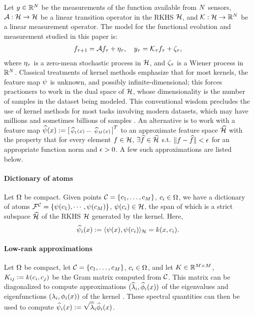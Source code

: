 Let $y\in\mathbb{R}^{N}$ be the measurements of the function available from $N$ sensors, $\mathcal{A}:\mathcal{H}\to\mathcal{H}$ be a linear transition operator in the RKHS $\mathcal{H}$, and $\mathcal{K}:\mathcal{H}\to\mathbb{R}^{N}$ be a linear measurement operator. The model for the functional evolution and measurement studied in this paper is:
\begin{align}\eqlabel{ideal_lin_evol}
 f_{\tindex+1} = \sysop f_{\tindex} + \eta_{\tindex}, \quad
 y_{\tindex} = \measop_{\tindex} f_{\tindex} + \zeta_{\tindex},
\end{align}
where $\eta_{\tau}$ is a zero-mean stochastic process in $\mathcal{H}$, and $\zeta_{\tau}$ is a Wiener process in $\mathbb{R}^{N}$. 
Classical treatments of kernel methods emphasize that for most kernels, the feature map $\psi$ is unknown, and possibly infinite-dimensional; this forces practioners to work in the dual space of $\mathcal{H}$, whose dimensionality is the number of samples in the dataset being modeled. This conventional wisdom precludes the use of kernel methods for most tasks involving modern datasets, which may have millions and sometimes billions of samples \cite{rahimi2007random}. An alternative is to work with a feature map 
$\widehat{\psi}(x) := \left[\begin{smallmatrix}
  \widehat{\psi}_1(x) & \cdots & \widehat{\psi}_{M}(x)
 \end{smallmatrix}\right]^T$ to an approximate feature space
 $\widehat{\mathcal{H}}$ with the property that for every element $f\in\mathcal{H}$, $\exists\widehat{f}\in\widehat{\mathcal{H}}$ s.t. $\|f-\widehat{f}\| < \epsilon$ for an appropriate function norm and $\epsilon>0$. A few such approximations are listed below.
 
\paragraph{Dictionary of atoms} Let $\Omega$ be compact. Given points $\mathcal{C} = \{c_1,\dots,c_{M}\}$, $c_i\in\Omega$, we have a dictionary of atoms $\mathcal{F}^{\mathcal{C}} = \{\psi(c_1), \cdots , \psi(c_{M})\}$, $\psi(c_i)\in\mathcal{H}$, the span of which is a strict subspace $\widehat{\mathcal{H}}$ of the RKHS $\mathcal{H}$ generated by the kernel. Here, 
 \begin{equation}\eqlabel{fmap_dict}
 \fmapApprox_i(x) := \l\fmap(x), \fmap(c_i)\r_{\fspace} = \kernel(x, c_i).
 \end{equation}
\paragraph{Low-rank approximations} Let $\Omega$ be compact, let $\mathcal{C} = \{c_1,\dots,c_{M}\}$, $c_i\in\Omega$, and let $K\in\mathbb{R}^{M\times M}$, $K_{ij}:=k(c_i,c_j)$ be the Gram matrix computed from $\mathcal{C}$. This matrix can be diagonalized to compute approximations $(\widehat {\lambda}_i, \widehat \phi_i(x))$ of the eigenvalues and eigenfunctions $(\lambda_i, \phi_i(x))$ of the kernel \cite{williams2001using2}. These spectral quantities can then be used to compute  $ \widehat{\psi}_i(x):=\sqrt{\widehat {\lambda}}_i\widehat \phi_i(x)$.
